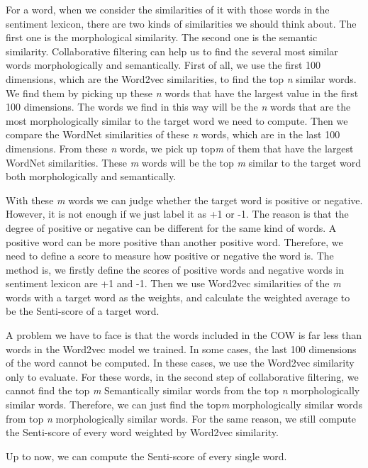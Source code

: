 \documentclass[10pt, conference, compsocconf]{IEEEtran}
\begin{document}
For a word, when we consider the similarities of it with those words in the sentiment lexicon, there are two kinds of similarities we should think about. The first one is the morphological similarity. The second one is the semantic similarity. Collaborative filtering can help us to find the several most similar words morphologically and semantically. First of all, we use the first 100 dimensions, which are the Word2vec similarities, to find the top \textit{n} similar words. We find them by picking up these \textit{n} words that have the largest value in the first 100 dimensions. The words we find in this way will be the \textit{n} words that are the most morphologically similar to the target word we need to compute. Then we compare the WordNet similarities of these \textit{n} words, which are in the last 100 dimensions. From these \textit{n} words, we pick up top\textit{m} of them that have the largest WordNet similarities. These \textit{m} words will be the top \textit{m} similar to the target word both morphologically and semantically.

With these \textit{m} words we can judge whether the target word is positive or negative. However, it is not enough if we just label it as +1 or -1. The reason is that the degree of positive or negative can be different for the same kind of words. A positive word can be more positive than another positive word. Therefore, we need to define a score to measure how positive or negative the word is. The method is, we firstly define the scores of positive words and negative words in sentiment lexicon are +1 and -1. Then we use Word2vec similarities of the \textit{m} words with a target word as the weights, and calculate the weighted average to be the Senti-score of a target word.

A problem we have to face is that the words included in the COW is far less than words in the Word2vec model we trained. In some cases, the last 100 dimensions of the word cannot be computed. In these cases, we use the Word2vec similarity only to evaluate. For these words, in the second step of collaborative filtering, we cannot find the top \textit{m} Semantically similar words from the top \textit{n} morphologically similar words. Therefore, we can just find the top\textit{m} morphologically similar words from top \textit{n} morphologically similar words. For the same reason, we still compute the Senti-score of every word weighted by Word2vec similarity.

Up to now, we can compute the Senti-score of every single word.
\end{document}

